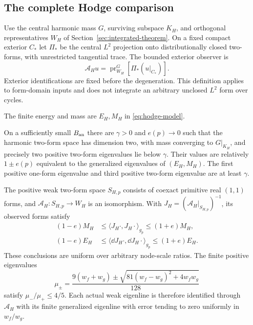 \subsection{The complete Hodge comparison}

Use the central harmonic mass $G$, surviving subspace $K_H$,
and orthogonal representatives $W_H$ of
Section~\ref{sec:integrated-theorem}.
On a fixed compact exterior $C_*$ let $\Pi_*$ be the central
$L^2$ projection onto distributionally closed two-forms, with
unrestricted tangential trace. The bounded exterior observer is
\begin{equation}\label{eq:hodge-observer}
 \mathcal A_Hu=\operatorname{pr}_{W_H}^G
                          [\Pi_*(u|_{C_*})].
\end{equation}
Exterior identifications are fixed before the degeneration.
This definition applies to form-domain inputs and does not
integrate an arbitrary unclosed $L^2$ form over cycles.

The finite energy and mass are $E_H,M_H$ in
\eqref{eq:hodge-model}.

\begin{recollection}\label{thm:hodge-input}
On a sufficiently small $B_{\rm an}$ there are $\gamma>0$
and $e(p)\to0$ such that the harmonic two-form space has
dimension two, with mass converging to $G|_{K_H}$, and precisely
two positive two-form eigenvalues lie below $\gamma$.
Their values are relatively $1\pm e(p)$ equivalent to the
generalized eigenvalues of $(E_H,M_H)$. The first positive
one-form eigenvalue and third positive two-form eigenvalue are
at least $\gamma$.

The positive weak two-form space $S_{H,p}$ consists of coexact
primitive real $(1,1)$ forms, and
$\mathcal A_H:S_{H,p}\to W_H$ is an isomorphism. With
$J_H=(\mathcal A_H|_{S_{H,p}})^{-1}$, its observed forms satisfy
\begin{equation}\label{eq:hodge-relative-forms}
 \begin{split}
 (1-e)M_H&\le \langle J_H\cdot,J_H\cdot\rangle_{g_p}
                                      \le(1+e)M_H,\\
 (1-e)E_H&\le \langle\dd J_H\cdot,\dd J_H\cdot\rangle_{g_p}
                                      \le(1+e)E_H.
 \end{split}
\end{equation}
These conclusions are uniform over arbitrary node-scale ratios.
The finite positive eigenvalues
\begin{equation}\label{eq:hodge-roots}
 \mu_\pm=
 \frac{9(w_f+w_g)\pm
              \sqrt{81(w_f-w_g)^2+4w_fw_g}}{128}
\end{equation}
satisfy $\mu_-/\mu_+\le4/5$. Each actual weak eigenline is
therefore identified through $\mathcal A_H$ with its finite
generalized eigenline with error tending to zero uniformly in
$w_f/w_g$.
\end{recollection}

